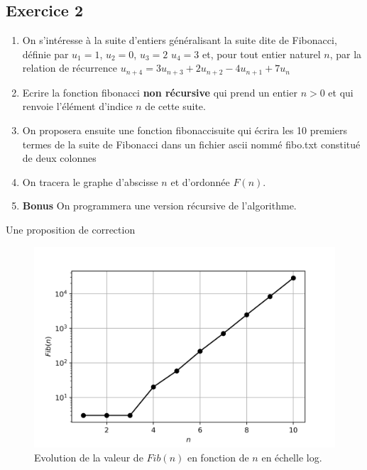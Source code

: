 \documentclass[a4paper,12pt]{article}
\begin{document}
\subsection{Exercice 2}
\begin{leftbar}
\begin{enumerate}
\item On s'int\'eresse \`a la suite d'entiers g\'en\'eralisant la suite dite de Fibonacci, d\'efinie par
$u_1=1$, $u_2=0$, $u_3=2$ $u_4=3$ et, pour tout entier naturel $n$, par la relation de r\'ecurrence $u_{n+4}=3u_{n+3}+2u_{n+2}-4u_{n+1}+7u_n$
\item Ecrire la fonction fibonacci \textbf{non r\'ecursive} qui prend un entier $n > 0$ et qui renvoie l'\'el\'ement d'indice $n$ de cette suite.
\item On proposera ensuite une fonction fibonaccisuite qui \'ecrira les 10 premiers termes de la suite de Fibonacci dans un fichier ascii nomm\'e fibo.txt constitu\'e de deux colonnes
\item On tracera le graphe d'abscisse $n$ et d'ordonn\'ee $F(n)$.
\item \textbf{Bonus} On programmera une version r\'ecursive de l'algorithme. 
\end{enumerate}
\end{leftbar}

Une proposition de correction


\begin{figure}
\begin{center}
\includegraphics{./2022/fibo.png}
\end{center}
\caption{Evolution de la valeur de $Fib(n)$ en fonction de $n$ en \'echelle log.}
\end{figure}
\end{document}
